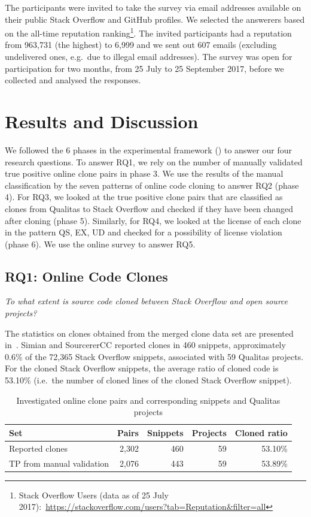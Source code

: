 \documentclass[10pt,journal,compsoc]{IEEEtran}
\begin{document}
The participants were invited to take the survey via email addresses available
on their public Stack Overflow and GitHub profiles. We selected the answerers
based on the all-time reputation ranking\footnote{Stack Overflow Users (data as
of 25 July 2017):~\url{https://stackoverflow.com/users?tab=Reputation&filter=all}}. The
invited participants had a reputation from 963,731 (the highest) to 6,999 and
we sent out 607 emails (excluding undelivered ones, e.g.\ due to
illegal email addresses). The survey was
open for participation for two months, from 25 July to 25 September 2017, before
we collected and analysed the responses.

\section{Results and Discussion}

We followed the 6 phases in the experimental framework
() to answer our four research questions. To answer RQ1,
we rely on the number of manually validated true positive online clone pairs in
phase 3. We use the results of the manual classification by the seven patterns
of online code cloning to answer RQ2 (phase 4). For RQ3, we looked at the true
positive clone pairs that are classified as clones from Qualitas to Stack
Overflow and checked if they have been changed after cloning (phase 5).
Similarly, for RQ4, we looked at the license of each clone in the pattern QS,
EX, UD and checked for a possibility of license violation (phase 6). We use
the online survey to answer RQ5.

\subsection{RQ1: Online Code Clones} 
\vspace{0.25cm}
\textit{To what extent is source
	code cloned between Stack Overflow and open source projects?}
\vspace{0.25cm}

The statistics on clones obtained from the merged clone data set are
presented in~. Simian and SourcererCC
reported clones in 460 snippets, approximately 0.6\% of the
72,365 Stack Overflow snippets, associated with 59 Qualitas
projects. For the cloned Stack Overflow snippets, the
average ratio of cloned code is 53.10\% (i.e.\ the number of cloned
lines of the cloned Stack Overflow snippet).

\begin{table}
	\caption{Investigated online clone pairs and corresponding snippets
		and Qualitas projects}
	\label{tab:snippets}
	\centering
	\begin{tabular}{p{2.2cm}rrrr}
		\toprule
		Set & Pairs & Snippets & Projects & Cloned ratio \\
		\midrule
		Reported clones & 2,302 & 460 & 59 & 53.10\% \\ 
		\midrule
		TP from manual validation & 2,076 & 443 & 59 & 53.89\% \\ 
		\bottomrule
	\end{tabular}
\end{table}
\end{document}

